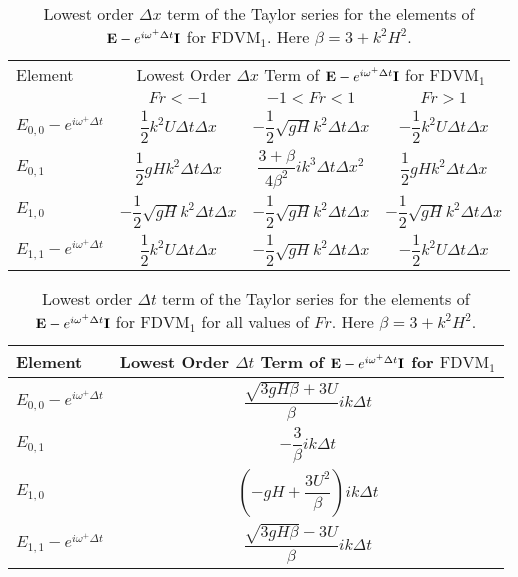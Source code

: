 \begin{table}
	\centering
	\begin{tabular}{l c c c}
		\hline
		Element & \multicolumn{3}{c}{Lowest Order $\Delta x$ Term of $\mathbf{E} - e^{i \omega^+ \Delta t} \mathbf{I}$ for $\text{FDVM}_1$} \T \B \\ 
		\cline{2-4}
		& $Fr < -1$& $-1 < Fr < 1$ & $Fr > 1$ \T \B \\ 
		\hline
		$E_{0,0} -  e^{i \omega^+ \Delta t} $& $ \dfrac{1}{2} k^2 U \Delta t \Delta x$& $ - \dfrac{1}{2} \sqrt{gH} k^2 \Delta t\Delta x$ &$- \dfrac{1}{2} k^2 U \Delta t \Delta x$\T \B \\
		$E_{0,1}$& $\dfrac{1}{2}gHk^2 \Delta t \Delta x $&$ \dfrac{3 + \beta}{4 \beta^2}i k^3\Delta  t\Delta x^2$ & $\dfrac{1}{2}gHk^2 \Delta t \Delta x $ \T \B \\
		$E_{1,0}$& $ - \dfrac{1}{2} \sqrt{gH} k^2 \Delta t\Delta x$&$ - \dfrac{1}{2} \sqrt{gH} k^2 \Delta t\Delta x$ & $ - \dfrac{1}{2} \sqrt{gH} k^2 \Delta t\Delta x$ \T \B  \\
		$E_{1,1} -  e^{i \omega^+ \Delta t}$& $ \dfrac{1}{2} k^2 U \Delta t \Delta x$&$ - \dfrac{1}{2} \sqrt{gH} k^2 \Delta t\Delta x$ & $- \dfrac{1}{2} k^2 U \Delta t \Delta x$  \T\B  \\
		\hline
	\end{tabular}
	\caption{Lowest order $\Delta x$ term of the Taylor series for the elements of $\mathbf{E} - e^{i \omega^+ \Delta t} \mathbf{I}$ for $\text{FDVM}_1$. Here $\beta = 3 + k^2 H^2$.}
	\label{tab:EerrFDVM1dxerror} 
\end{table}
\begin{table}
	\centering
	\begin{tabular}{l c}
		\hline 
		Element & \multicolumn{1}{c}{Lowest Order $\Delta t$ Term of $\mathbf{E} - e^{i \omega^+ \Delta t} \mathbf{I}$ for $\text{FDVM}_1$}\T\B \\
		\hline 
		$E_{0,0} -  e^{i \omega^+ \Delta t} $ & $\dfrac{\sqrt{3gH \beta} + 3U}{\beta} ik \Delta t$ \T \B \\
		$E_{0,1}$&$ - \dfrac{3}{\beta} ik\Delta t$ \T \B \\
		$E_{1,0}$& $ \left(-gH + \dfrac{3U^2}{\beta}\right)ik \Delta t$ \T \B  \\
		$E_{1,1} -  e^{i \omega^+ \Delta t}$& $\dfrac{\sqrt{3gH \beta} - 3U}{\beta} ik \Delta t$ \T \B  \\
		\hline
	\end{tabular}
	\caption{Lowest order $\Delta t$ term of the Taylor series for the elements of $\mathbf{E} - e^{i \omega^+ \Delta t} \mathbf{I}$ for $\text{FDVM}_1$ for all values of $Fr$. Here $\beta = 3 + k^2 H^2$.}
	\label{tab:EerrFDVM1dterror} 
\end{table}
